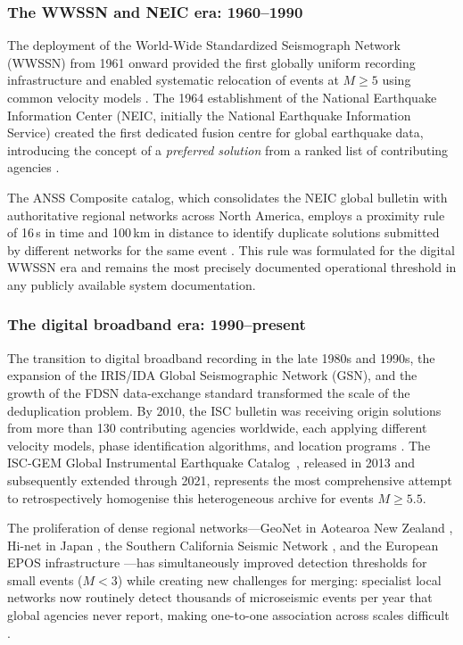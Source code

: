 \documentclass[12pt]{article}
\newcommand{\catalog}{catalog}
\newcommand{\Catalog}{Catalog}
\begin{document}
\subsubsection{The WWSSN and NEIC era: 1960–1990}

The deployment of the World-Wide Standardized Seismograph Network (WWSSN) from
1961 onward provided the first globally uniform recording infrastructure and
enabled systematic relocation of events at $M \geq 5$ using common velocity
models \citep{Engdahl1998}.  The 1964 establishment of the National Earthquake
Information Center (NEIC, initially the National Earthquake Information Service)
created the first dedicated fusion centre for global earthquake data, introducing
the concept of a \emph{preferred solution} from a ranked list of contributing
agencies \citep{usgs_comcat}.

The ANSS Composite \catalog, which consolidates the NEIC global bulletin with
authoritative regional networks across North America, employs a proximity rule
of 16\,s in time and 100\,km in distance to identify duplicate solutions submitted
by different networks for the same event \citep{NCEDCComCat}.  This rule was
formulated for the digital WWSSN era and remains the most precisely documented
operational threshold in any publicly available system documentation.

\subsubsection{The digital broadband era: 1990–present}

The transition to digital broadband recording in the late 1980s and 1990s, the
expansion of the IRIS/IDA Global Seismographic Network (GSN), and the growth of
the FDSN data-exchange standard \citep{QuakeML} transformed the scale of the
deduplication problem.  By 2010, the ISC bulletin was receiving origin solutions
from more than 130 contributing agencies worldwide, each applying different
velocity models, phase identification algorithms, and location programs
\citep{ISCBulletinRebuild2020}.  The ISC-GEM Global Instrumental Earthquake
\Catalog\ \citep{Storchak2013, ISCGEM2018}, released in 2013 and subsequently
extended through 2021, represents the most comprehensive attempt to
retrospectively homogenise this heterogeneous archive for events $M \geq 5.5$.

The proliferation of dense regional networks—GeoNet in Aotearoa New Zealand
\citep{GeoNetEqCatalogue}, Hi-net in Japan \citep{Obara2005}, the Southern
California Seismic Network \citep{Hutton2010}, and the European EPOS infrastructure
\citep{EPOSSeisTCS}—has simultaneously improved detection thresholds for small
events ($M < 3$) while creating new challenges for merging: specialist local
networks now routinely detect thousands of microseismic events per year that
global agencies never report, making one-to-one association across scales
difficult \citep{Woessner2005, Illsley2025}.
\end{document}

